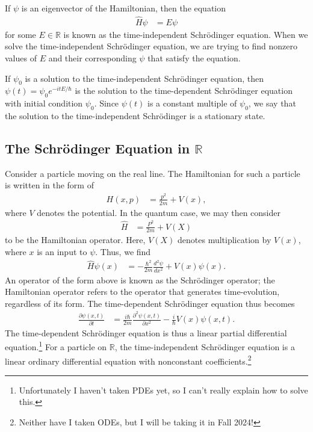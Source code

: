 \documentclass[10pt]{extarticle}
\newcommand{\R}{\mathbb{R}}
\theoremstyle{plain}
\theoremstyle{definition}
\theoremstyle{remark}
\renewcommand{\newline}{\hfill\break}
\begin{document}
  If $\psi$ is an eigenvector of the Hamiltonian, then the equation
  \begin{align*}
    \hat{H}\psi &= E\psi
  \end{align*}
  for some $E\in \R$ is known as the time-independent Schrödinger equation. When we solve the time-independent Schrödinger equation, we are trying to find nonzero values of $E$ and their corresponding $\psi$ that satisfy the equation.\newline

  If $\psi_0$ is a solution to the time-independent Schrödinger equation, then $\displaystyle \psi(t) = \psi_0 e^{-itE/\hbar}$ is the solution to the time-dependent Schrödinger equation with initial condition $\psi_0$. Since $\psi(t)$ is a constant multiple of $\psi_0$, we say that the solution to the time-independent Schrödinger is a stationary state.
  \subsection{The Schrödinger Equation in $\R$}%
  Consider a particle moving on the real line. The Hamiltonian for such a particle is written in the form of
  \begin{align*}
    H(x,p) &= \frac{p^2}{2m} + V(x),
  \end{align*}
  where $V$ denotes the potential. In the quantum case, we may then consider
  \begin{align*}
    \hat{H} &= \frac{P^2}{2m} + V(X)
  \end{align*}
  to be the Hamiltonian operator. Here, $V(X)$ denotes multiplication by $V(x)$, where $x$ is an input to $\psi$. Thus, we find
  \begin{align*}
    \hat{H}\psi(x) &= -\frac{\hbar^2}{2m}\frac{d^2\psi}{dx^2} + V(x)\psi(x).
  \end{align*}
  An operator of the form above is known as the Schrödinger operator; the Hamiltonian operator refers to the operator that generates time-evolution, regardless of its form. The time-dependent Schrödinger equation thus becomes
  \begin{align*}
    \frac{\partial \psi(x,t)}{\partial t} &= \frac{i\hbar}{2m}\frac{\partial^2\psi(x,t)}{\partial x^2} - \frac{i}{\hbar}V(x)\psi(x,t).
  \end{align*}
  The time-dependent Schrödinger equation is thus a linear partial differential equation.\footnote{Unfortunately I haven't taken PDEs yet, so I can't really explain how to solve this.} For a particle on $\R$, the time-independent Schrödinger equation is a linear ordinary differential equation with nonconstant coefficients.\footnote{Neither have I taken ODEs, but I will be taking it in Fall 2024!}
\end{document}
